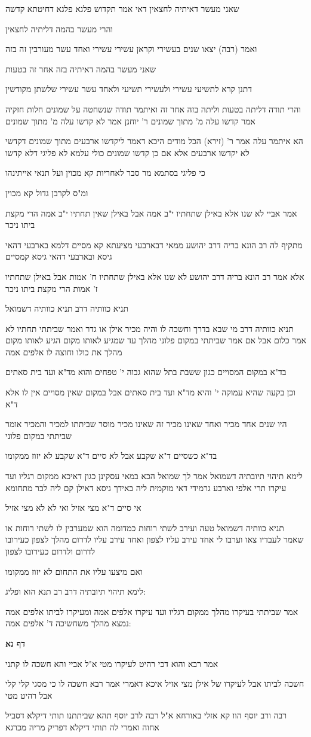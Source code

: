 \documentclass[12pt, openany]{book}
\newcommand{\sethebfont}{
\fontsize{10.5pt}{21.0pt} \selectfont
}
\newcommand{\textblock}[1]{
{\sethebfont #1\\}	
}
\newcommand{\sectname}{}
\newcommand{\newsection}[1]{
	\addcontentsline{toc}{section}{#1}
	\renewcommand{\sectname}{#1}	
	\vspace{-\baselineskip}
	\begin{center}
		\textbf{%
\fontsize{16pt}{16pt}\selectfont
			#1}
	\end{center}
	\vspace{-\baselineskip}
	\nopagebreak
}
\begin{document}
\textblock{שאני מעשר דאיתיה לחצאין דאי אמר תקדוש פלגא פלגא דחיטתא קדשה}
\textblock{והרי מעשר בהמה דליתיה לחצאין}
\textblock{ואמר (רבה) יצאו שנים בעשירי וקראן עשירי עשירי ואחד עשר מעורבין זה בזה}
\textblock{שאני מעשר בהמה דאיתיה בזה אחר זה בטעות}
\textblock{דתנן קרא לתשיעי עשירי ולעשירי תשיעי ולאחד עשר עשירי שלשתן מקודשין}
\textblock{והרי תודה דליתה בטעות וליתה בזה אחר זה ואיתמר תודה שנשחטה על שמונים חלות חזקיה אמר קדשו עלה מ' מתוך שמונים ר' יוחנן אמר לא קדשו עלה מ' מתוך שמונים}
\textblock{הא איתמר עלה אמר ר' (זירא) הכל מודים היכא דאמר ליקדשו ארבעים מתוך שמונים דקדשי לא יקדשו ארבעים אלא אם כן קדשו שמונים כולי עלמא לא פליגי דלא קדשו}
\textblock{כי פליגי בסתמא מר סבר לאחריות קא מכוין ועל תנאי אייתינהו}
\textblock{ומ"ס לקרבן גדול קא מכוין}
\textblock{אמר אביי לא שנו אלא באילן שתחתיו י"ב אמה אבל באילן שאין תחתיו י"ב אמה הרי מקצת ביתו ניכר}
\textblock{מתקיף לה רב הונא בריה דרב יהושע ממאי דבארבעי מציעתא קא מסיים דלמא בארבעי דהאי גיסא ובארבעי דהאי גיסא קמסיים}
\textblock{אלא אמר רב הונא בריה דרב יהושע לא שנו אלא באילן שתחתיו ח' אמות אבל באילן שתחתיו ז' אמות הרי מקצת ביתו ניכר}
\textblock{תניא כוותיה דרב תניא כוותיה דשמואל}
\textblock{תניא כוותיה דרב מי שבא בדרך וחשכה לו והיה מכיר אילן או גדר ואמר שביתתי תחתיו לא אמר כלום אבל אם אמר שביתתי במקום פלוני מהלך עד שמגיע לאותו מקום הגיע לאותו מקום מהלך את כולו וחוצה לו אלפים אמה}
\textblock{בד"א במקום המסויים כגון ששבת בתל שהוא גבוה י' טפחים והוא מד"א ועד בית סאתים}
\textblock{וכן בקעה שהיא עמוקה י' והיא מד"א ועד בית סאתים אבל במקום שאין מסויים אין לו אלא ד"א}
\textblock{היו שנים אחד מכיר ואחד שאינו מכיר זה שאינו מכיר מוסר שביתתו למכיר והמכיר אומר שביתתי במקום פלוני}
\textblock{בד"א כשסיים ד"א שקבע אבל לא סיים ד"א שקבע לא יזוז ממקומו}
\textblock{לימא תיהוי תיובתיה דשמואל אמר לך שמואל הכא במאי עסקינן כגון דאיכא ממקום רגליו ועד עיקרו תרי אלפי וארבע גרמידי דאי מוקמית ליה באידך גיסא דאילן קם ליה לבר מתחומא}
\textblock{אי סיים ד"א מצי אזיל ואי לא לא מצי אזיל}
\textblock{תניא כוותיה דשמואל טעה ועירב לשתי רוחות כמדומה הוא שמערבין לו לשתי רוחות או שאמר לעבדיו צאו וערבו לי אחד עירב עליו לצפון ואחד עירב עליו לדרום מהלך לצפון כעירובו לדרום ולדרום כעירובו לצפון}
\textblock{ואם מיצעו עליו את התחום לא יזוז ממקומו}
\textblock{לימא תיהוי תיובתיה דרב רב תנא הוא ופליג:}
\textblock{אמר שביתתי בעיקרו מהלך ממקום רגליו ועד עיקרו אלפים אמה ומעיקרו לביתו אלפים אמה נמצא מהלך משחשיכה ד' אלפים אמה:}
\newsection{דף נא}
\textblock{אמר רבא והוא דכי רהיט לעיקרו מטי א"ל אביי והא חשכה לו קתני}
\textblock{חשכה לביתו אבל לעיקרו של אילן מצי אזיל איכא דאמרי אמר רבא חשכה לו כי מסגי קלי קלי אבל רהיט מטי}
\textblock{רבה ורב יוסף הוו קא אזלי באורחא א"ל רבה לרב יוסף תהא שביתתנו תותי דיקלא דסביל אחוה ואמרי לה תותי דיקלא דפריק מריה מכרגא}
\end{document}
